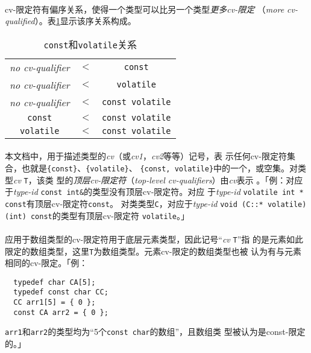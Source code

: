 \paragraph{}
cv-限定符有偏序关系，使得一个类型可以比另一个类型\textit{更多cv-限定}
（\textit{more cv-qualified}）。表\ref{tab:cvrel}显示该序关系构成。
\begin{table}
  \centering
  \caption{\texttt{const}和\texttt{volatile}关系}
  \begin{tabular}{|ccc|}
    \hline
    \textit{no cv-qualifier} & $ < $ & \texttt{const}          \\
    \textit{no cv-qualifier} & $ < $ & \texttt{volatile}       \\
    \textit{no cv-qualifier} & $ < $ & \texttt{const volatile} \\
    \texttt{const}           & $ < $ & \texttt{const volatile} \\
    \texttt{volatile}        & $ < $ & \texttt{const volatile} \\
    \hline
  \end{tabular}
  \label{tab:cvrel}
\end{table}

\paragraph{}
本文档中，用于描述类型的\textit{cv}（或\textit{cv1}，\textit{cv2}等等）记号，表
示任何cv-限定符集合，也就是\texttt{\{const\}}、\texttt{\{volatile\}}、
\texttt{\{const, volatile\}}中的一个，或空集。对类型\textit{cv} \texttt{T}，该类
型的\textit{顶层cv-限定符}（\textit{top-level cv-qualifiers}）由\textit{cv}表示
。「例：对应于\textit{type-id} \texttt{const int\&}的类型没有顶层cv-限定符。对应
于\textit{type-id} \texttt{volatile int * const}有顶层cv-限定符\texttt{const}。
对类类型\texttt{C}，对应于\textit{type-id}
\texttt{void (C::* volatile)(int) const}的类型有顶层cv-限定符
\texttt{volatile}。」

\paragraph{}
应用于数组类型的cv-限定符用于底层元素类型，因此记号``\textit{cv} \texttt{T}''指
的是元素如此限定的数组类型，这里\texttt{T}为数组类型。元素cv-限定的数组类型也被
认为有与元素相同的cv-限定。「例：
\begin{lstlisting}
  typedef char CA[5];
  typedef const char CC;
  CC arr1[5] = { 0 };
  const CA arr2 = { 0 };
\end{lstlisting}
\texttt{arr1}和\texttt{arr2}的类型均为``5个\texttt{const char}的数组''，且数组类
型被认为是const-限定的。」

